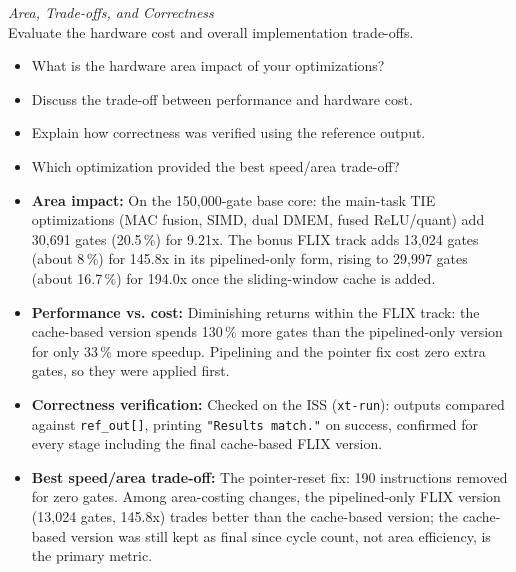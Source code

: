 \documentclass[11pt,a4paper]{report}
\newcommand{\question}[1]{\noindent\textit{#1}\\}
\newcommand{\answer}[1]{\vspace{-1.5em}\begin{oframed}#1\end{oframed}}
\begin{document}
\question{Area, Trade-offs, and Correctness}

Evaluate the hardware cost and overall implementation trade-offs.
\begin{itemize}
    \item What is the hardware area impact of your optimizations?
    \item Discuss the trade-off between performance and hardware cost.
    \item Explain how correctness was verified using the reference output.
    \item Which optimization provided the best speed/area trade-off?
\end{itemize}
\answer{
\begin{itemize}
    \item \textbf{Area impact:} On the 150,000-gate base core: the
        main-task TIE optimizations (MAC fusion, SIMD, dual DMEM,
        fused ReLU/quant) add 30,691 gates (20.5\,\%) for 9.21x. The
        bonus FLIX track adds 13,024 gates (about 8\,\%) for 145.8x in
        its pipelined-only form, rising to 29,997 gates (about
        16.7\,\%) for 194.0x once the sliding-window cache is added.
    \item \textbf{Performance vs. cost:} Diminishing returns within
        the FLIX track: the cache-based version spends 130\,\% more
        gates than the pipelined-only version for only 33\,\% more
        speedup. Pipelining and the pointer fix cost zero extra gates,
        so they were applied first.
    \item \textbf{Correctness verification:} Checked on the ISS
        (\texttt{xt-run}): outputs compared against
        \texttt{ref\_out[]}, printing \texttt{"Results match."} on
        success, confirmed for every stage including the final
        cache-based FLIX version.
    \item \textbf{Best speed/area trade-off:} The pointer-reset fix:
        190 instructions removed for zero gates. Among area-costing
        changes, the pipelined-only FLIX version (13,024 gates,
        145.8x) trades better than the cache-based version; the
        cache-based version was still kept as final since cycle
        count, not area efficiency, is the primary metric.
\end{itemize}
}
\end{document}
